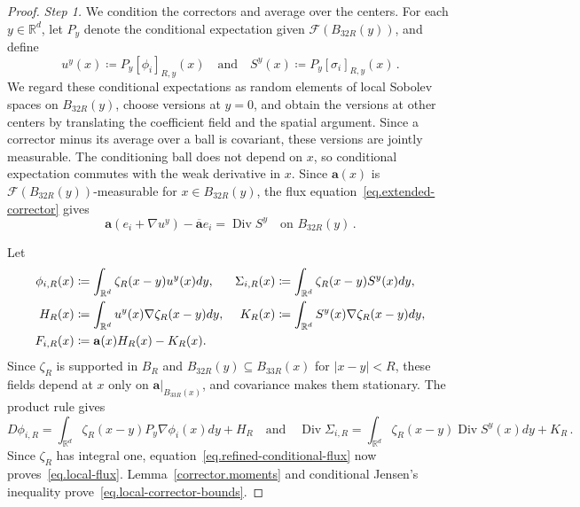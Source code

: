 \documentclass[11pt]{amsart}
\theoremstyle{definition}
\theoremstyle{remark}
\numberwithin{equation}{section}
\newcommand{\R}{\mathbb R}
\renewcommand{\a}{\mathbf a}
\newcommand{\ahom}{\overline{\mathbf a}}
\newcommand{\Div}{\operatorname{Div}}
\begin{document}
\begin{proof}
\emph{Step 1.} We condition the correctors and average over the centers. For each $y\in\R^d$, let $P_y$ denote the conditional expectation given $\mathcal F(B_{32R}(y))$, and define
\begin{equation}\label{eq.refined-conditional-fields}
 u^y(x)\coloneqq P_y[\phi_i]_{R,y}(x)
 \quad\text{and}\quad S^y(x)\coloneqq P_y[\sigma_i]_{R,y}(x)\, .
\end{equation}
We regard these conditional expectations as random elements of local Sobolev spaces on $B_{32R}(y)$, choose versions at $y=0$, and obtain the versions at other centers by translating the coefficient field and the spatial argument. Since a corrector minus its average over a ball is covariant, these versions are jointly measurable. The conditioning ball does not depend on $x$, so conditional expectation commutes with the weak derivative in $x$. Since $\a(x)$ is $\mathcal F(B_{32R}(y))$-measurable for $x\in B_{32R}(y)$, the flux equation~\eqref{eq.extended-corrector} gives
\begin{equation}\label{eq.refined-conditional-flux}
 \a(e_i+\nabla u^y)-\ahom e_i=\Div S^y
 \quad\text{on }B_{32R}(y)\, .
\end{equation}

Let
\begin{align}
 \phi_{i,R}(x)&\coloneqq\int_{\R^d}\zeta_R(x-y)u^y(x)dy,
 &\Sigma_{i,R}(x)&\coloneqq\int_{\R^d}\zeta_R(x-y)S^y(x)dy,\notag\\
 H_R(x)&\coloneqq\int_{\R^d}u^y(x)\nabla\zeta_R(x-y)dy,
 &K_R(x)&\coloneqq\int_{\R^d}S^y(x)\nabla\zeta_R(x-y)dy,\notag\\
 F_{i,R}(x)&\coloneqq\a(x)H_R(x)-K_R(x).
 \label{eq.refined-local-definition}
\end{align}
Since $\zeta_R$ is supported in $B_R$ and $B_{32R}(y)\subseteq B_{33R}(x)$ for $|x-y|<R$, these fields depend at $x$ only on $\a|_{B_{33R}(x)}$, and covariance makes them stationary. The product rule gives
\begin{equation*}
 D\phi_{i,R}=\int_{\R^d}\zeta_R(x-y)P_y\nabla\phi_i(x)dy+H_R
 \quad\text{and}\quad
 \Div\Sigma_{i,R}=\int_{\R^d}\zeta_R(x-y)\Div S^y(x)dy+K_R\, .
\end{equation*}
Since $\zeta_R$ has integral one, equation~\eqref{eq.refined-conditional-flux} now proves~\eqref{eq.local-flux}. Lemma~\ref{corrector.moments} and conditional Jensen's inequality prove~\eqref{eq.local-corrector-bounds}.


\end{proof}
\end{document}

